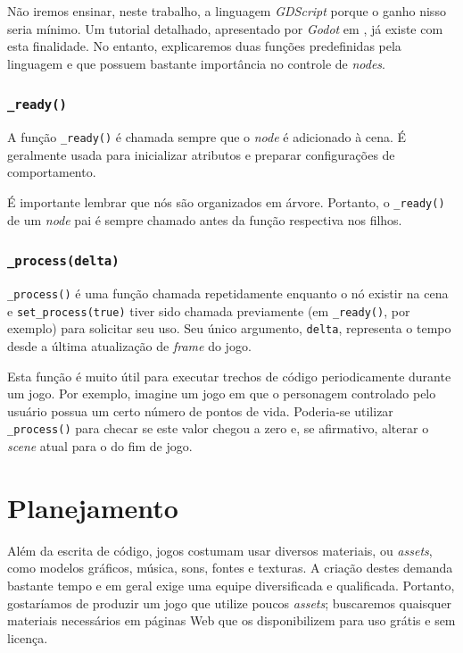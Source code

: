 Não iremos ensinar, neste trabalho, a linguagem \textit{GDScript} porque o ganho nisso seria mínimo. Um tutorial detalhado, apresentado por \textit{Godot} em \citep{godotGDScriptTutorial}, já existe com esta finalidade. No entanto, explicaremos duas funções predefinidas pela linguagem e que possuem bastante importância no controle de \textit{nodes}.

\subsubsection{\texttt{\_ready()}}

A função \texttt{\_ready()} é chamada sempre que o \textit{node} é adicionado à cena. É geralmente usada para inicializar atributos e preparar configurações de comportamento.

É importante lembrar que nós são organizados em árvore. Portanto, o \texttt{\_ready()} de um \textit{node} pai é sempre chamado antes da função respectiva nos filhos.

\subsubsection{\texttt{\_process(delta)}}

\texttt{\_process()} é uma função chamada repetidamente enquanto o nó existir na cena e \texttt{set\_process(true)} tiver sido chamada previamente (em \texttt{\_ready()}, por exemplo) para solicitar seu uso. Seu único argumento, \texttt{delta}, representa o tempo desde a última atualização de \textit{frame} do jogo.

Esta função é muito útil para executar trechos de código periodicamente durante um jogo. Por exemplo, imagine um jogo em que o personagem controlado pelo usuário possua um certo número de pontos de vida. Poderia-se utilizar \texttt{\_process()} para checar se este valor chegou a zero e, se afirmativo, alterar o \textit{scene} atual para o do fim de jogo.


\section{Planejamento}

Além da escrita de código, jogos costumam usar diversos materiais, ou \emph{assets}, como modelos gráficos, música, sons, fontes e texturas. A criação destes demanda bastante tempo e em geral exige uma equipe diversificada e qualificada. Portanto, gostaríamos de produzir um jogo que utilize poucos \textit{assets}; buscaremos quaisquer materiais necessários em páginas Web que os disponibilizem para uso grátis e sem licença.

